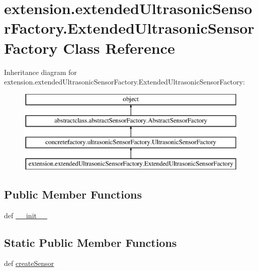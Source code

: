 \hypertarget{classextension_1_1extendedUltrasonicSensorFactory_1_1ExtendedUltrasonicSensorFactory}{}\section{extension.\+extended\+Ultrasonic\+Sensor\+Factory.\+Extended\+Ultrasonic\+Sensor\+Factory Class Reference}
\label{classextension_1_1extendedUltrasonicSensorFactory_1_1ExtendedUltrasonicSensorFactory}
Inheritance diagram for extension.\+extended\+Ultrasonic\+Sensor\+Factory.\+Extended\+Ultrasonic\+Sensor\+Factory\+:\begin{figure}[H]
\begin{center}
\leavevmode
\includegraphics[height=4.000000cm]{classextension_1_1extendedUltrasonicSensorFactory_1_1ExtendedUltrasonicSensorFactory}
\end{center}
\end{figure}
\subsection*{Public Member Functions}
\begin{DoxyCompactItemize}
\item 
def \hyperlink{classextension_1_1extendedUltrasonicSensorFactory_1_1ExtendedUltrasonicSensorFactory_a5731df22aa0141dc7a90b332b141f1f4}{\+\_\+\+\_\+init\+\_\+\+\_\+}
\end{DoxyCompactItemize}
\subsection*{Static Public Member Functions}
\begin{DoxyCompactItemize}
\item 
def \hyperlink{classextension_1_1extendedUltrasonicSensorFactory_1_1ExtendedUltrasonicSensorFactory_af11c5f2a20e1346b79934436a4700f39}{create\+Sensor}
\end{DoxyCompactItemize}


